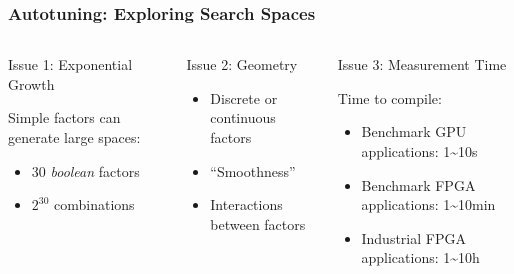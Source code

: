\documentclass[10pt, compress, aspectratio=169, xcolor={table,usenames,dvipsnames}]{beamer}
\begin{document}
\begin{frame}
    \frametitle{Autotuning: Exploring Search Spaces}
    \begin{columns}[c]
            \begin{block}{Issue 1: \alert{Exponential Growth}}
                \vspace{.2cm}

                \alert{Simple factors} can generate \alert{large spaces}:

                \begin{itemize}
                    \item 30 \textit{boolean} factors
                    \item $2^{30}$ combinations
                \end{itemize}
            \end{block}

            \begin{block}{Issue 2: \alert{Geometry}}
                \begin{itemize}
                    \item \alert{Discrete} or \alert{continuous} factors
                    \item \alert{``Smoothness''}
                    \item \alert{Interactions} between factors
                \end{itemize}
            \end{block}

            \begin{block}{Issue 3: \alert{Measurement Time}}
                \vspace{.2cm}

                Time to \alert{compile}:

                \begin{itemize}
                    \item \alert{Benchmark} GPU applications:
                        \alert{1\textasciitilde10s}
                    \item \alert{Benchmark} FPGA applications:
                        \alert{1\textasciitilde10min}
                    \item \alert{Industrial} FPGA applications:
                        \alert{1\textasciitilde10h}
                \end{itemize}
            \end{block}

    \end{columns}
\end{frame}
\end{document}
